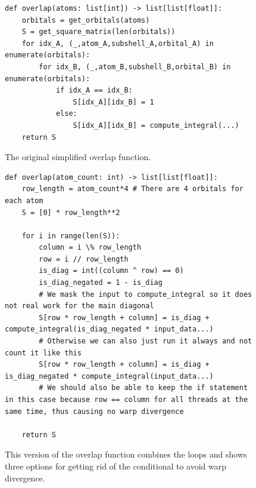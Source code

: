 \begin{figure}[H]
\begin{verbatim}
def overlap(atoms: list[int]) -> list[list[float]]:
    orbitals = get_orbitals(atoms)
    S = get_square_matrix(len(orbitals))
    for idx_A, (_,atom_A,subshell_A,orbital_A) in enumerate(orbitals):
        for idx_B, (_,atom_B,subshell_B,orbital_B) in enumerate(orbitals):
            if idx_A == idx_B:
                S[idx_A][idx_B] = 1
            else:
                S[idx_A][idx_B] = compute_integral(...)
    return S
\end{verbatim}
\caption{The original simplified overlap function.}
\end{figure}

\begin{figure}[H]
\begin{verbatim}
def overlap(atom_count: int) -> list[list[float]]:
    row_length = atom_count*4 # There are 4 orbitals for each atom
    S = [0] * row_length**2

    for i in range(len(S)):
        column = i \% row_length
        row = i // row_length
        is_diag = int((column ^ row) == 0)
        is_diag_negated = 1 - is_diag
        # We mask the input to compute_integral so it does not real work for the main diagonal
        S[row * row_length + column] = is_diag + compute_integral(is_diag_negated * input_data...)
        # Otherwise we can also just run it always and not count it like this
        S[row * row_length + column] = is_diag + is_diag_negated * compute_integral(input_data...)
        # We should also be able to keep the if statement in this case because row == column for all threads at the same time, thus causing no warp divergence

    return S
\end{verbatim}
\caption{This version of the overlap function combines the loops and shows three options for getting rid of the conditional to avoid warp divergence.}
\end{figure}



